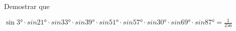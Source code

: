 \begin{problem}
	Demostrar que 
	\begin{center}
		$\displaystyle{\sin{\ang{3}} \cdot sin{\ang{21}} \cdot sin{\ang{33}} \cdot sin{\ang{39}} \cdot sin{\ang{51}} \cdot sin{\ang{57}} \cdot sin{\ang{30}} \cdot sin{\ang{69}} \cdot sin{\ang{87}} = \frac{1}{256}}$
	\end{center}
\end{problem}